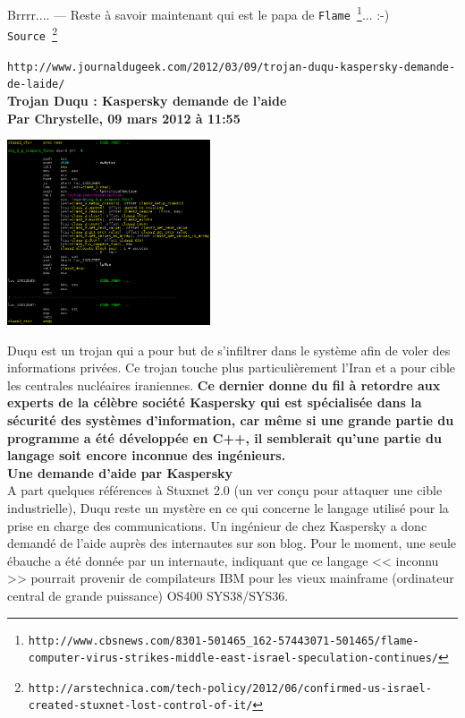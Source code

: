 \documentclass[11pt,twoside,a4paper]{article}
\begin{document}
Brrrr.... --- Reste {\`a} savoir maintenant qui est le papa de \texttt{Flame~\footnote{\texttt{http://www.cbsnews.com/8301-501465\_162-57443071-501465/flame-computer-virus-strikes-middle-east-israel-speculation-continues/}}}... :-)~\\

\texttt{Source~\footnote{\texttt{http://arstechnica.com/tech-policy/2012/06/confirmed-us-israel-created-stuxnet-lost-control-of-it/}}}~\\

\clearpage

\texttt{http://www.journaldugeek.com/2012/03/09/trojan-duqu-kaspersky-demande-de-laide/}~\\

\textbf{\LARGE Trojan Duqu : Kaspersky demande de l'aide}~\\

\textbf{\small Par Chrystelle, 09 mars 2012 {\`a} 11:55}~\\

\begin{minipage}[ht]{6.25cm}
	\includegraphics[width=6.00cm]{img/Duqu.png}
\end{minipage} \hfill \begin{minipage}[ht]{12.50cm}
	\small
	Duqu est un trojan qui a pour but de s'infiltrer dans le syst{\`e}me afin de voler des informations priv{\'e}es. Ce trojan touche plus particuli{\`e}rement l'Iran et a pour cible les centrales nucl{\'e}aires iraniennes. \textbf{Ce dernier donne du fil {\`a} retordre aux experts de la c{\'e}l{\`e}bre soci{\'e}t{\'e} Kaspersky qui est sp{\'e}cialis{\'e}e dans la s{\'e}curit{\'e} des syst{\`e}mes d'information, car m{\^e}me si une grande partie du programme a {\'e}t{\'e} d{\'e}velopp{\'e}e en C++, il semblerait qu'une partie du langage soit encore inconnue des ing{\'e}nieurs. }~\\

	\textbf{\large Une demande d'aide par Kaspersky}~\\

	A part quelques r{\'e}f{\'e}rences {\`a} Stuxnet 2.0 (un ver con\c{c}u pour attaquer une cible industrielle), Duqu reste un myst{\`e}re en ce qui concerne le langage utilis{\'e} pour la prise en charge des communications. Un ing{\'e}nieur de chez Kaspersky a donc demand{\'e} de l'aide aupr{\`e}s des internautes sur son blog. Pour le moment, une seule {\'e}bauche a {\'e}t{\'e} donn{\'e}e par un internaute, indiquant que ce langage << inconnu >> pourrait provenir de compilateurs IBM pour les vieux mainframe (ordinateur central de grande puissance) OS400 SYS38/SYS36.~\\	
\end{minipage}	
\end{document}
